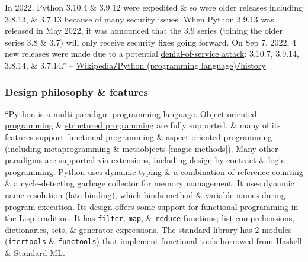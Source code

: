 \documentclass{article}
\numberwithin{equation}{section}
\begin{document}
In 2022, Python 3.10.4 \& 3.9.12 were expedited \& so were older releases including 3.8.13, \& 3.7.13 because of many security issues. When Python 3.9.13 was released in May 2022, it was announced that the 3.9 series (joining the older series 3.8 \& 3.7) will only receive security fixes going forward. On Sep 7, 2022, 4 new releases were made due to a potential \href{https://en.wikipedia.org/wiki/Denial-of-service_attack}{denial-of-service attack}: 3.10.7, 3.9.14, 3.8.14, \& 3.7.14.'' -- \href{https://en.wikipedia.org/wiki/Python_(programming_language)#History}{Wikipedia\texttt{/}Python (programming language)\texttt{/}history}

\subsubsection{Design philosophy \& features}
``Python is a \href{https://en.wikipedia.org/wiki/Multi-paradigm_programming_language}{multi-paradigm programming language}. \href{https://en.wikipedia.org/wiki/Object-oriented_programming}{Object-oriented programming} \& \href{https://en.wikipedia.org/wiki/Structured_programming}{structured programming} are fully supported, \& many of its features support functional programming \& \href{https://en.wikipedia.org/wiki/Aspect-oriented_programming}{aspect-oriented programming} (including \href{https://en.wikipedia.org/wiki/Metaprogramming}{metaprogramming} \& \href{https://en.wikipedia.org/wiki/Metaobject}{metaobjects} [magic methods]). Many other paradigms are supported via extensions, including \href{https://en.wikipedia.org/wiki/Design_by_contract}{design by contract} \& \href{https://en.wikipedia.org/wiki/Logic_programming}{logic programming}. Python uses \href{https://en.wikipedia.org/wiki/Dynamic_typing}{dynamic typing} \& a combination of \href{https://en.wikipedia.org/wiki/Reference_counting}{reference counting} \& a cycle-detecting garbage collector for \href{https://en.wikipedia.org/wiki/Memory_management}{memory management}. It uses dynamic \href{https://en.wikipedia.org/wiki/Name_resolution_(programming_languages)}{name resolution} (\href{https://en.wikipedia.org/wiki/Late_binding}{late binding}), which binds method \& variable names during program execution. Its design offers some support for functional programming in the \href{https://en.wikipedia.org/wiki/Lisp_(programming_language)}{Lisp} tradition. It has \texttt{filter}, \texttt{map}, \& \texttt{reduce} functions; \href{https://en.wikipedia.org/wiki/List_comprehension}{list comprehensions}, \href{https://en.wikipedia.org/wiki/Associative_array}{dictionaries}, sets, \& \href{https://en.wikipedia.org/wiki/Generator_(computer_programming)}{generator} expressions. The standard library has 2 modules (\texttt{itertools} \& \texttt{functools}) that implement functional tools borrowed from \href{https://en.wikipedia.org/wiki/Haskell_(programming_language)}{Haskell} \& \href{https://en.wikipedia.org/wiki/Standard_ML}{Standard ML}.
\end{document}
